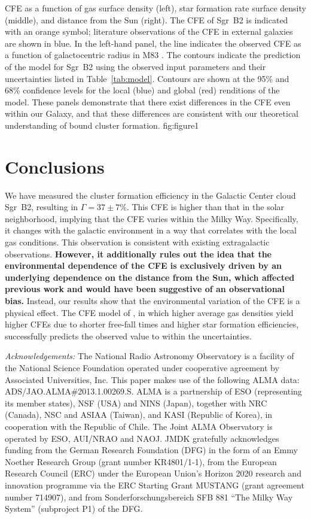 \documentclass[twocolumn]{aastex62}
\def\referee#1{\textbf{#1}}
\begin{document}
{CFE as a function of gas surface density (left), star formation rate surface
density (middle), and distance from the Sun (right). The CFE of Sgr~B2 is
indicated with an orange symbol; literature observations of the CFE in
external galaxies are shown in blue. In the left-hand panel, the line indicates
the observed CFE as a function of galactocentric radius in M83
\citep{Adamo2015a}. The contours indicate the prediction of the
\citet{Kruijssen2012a} model for Sgr~B2 using the observed input parameters and
their uncertainties listed in Table~\ref{tab:model}. Contours are shown at the
95\% and 68\% confidence levels for the local (blue) and global (red)
renditions of the model. These panels demonstrate that there exist differences
in the CFE even within our Galaxy, and that these differences are consistent
with our theoretical understanding of bound cluster formation. 
}
{fig:figure}{1}{\textwidth}

\section{Conclusions}
We have measured the cluster formation efficiency in the Galactic Center cloud
Sgr~B2, resulting in $\Gamma=37\pm7\%$. This CFE is higher than that in the solar
neighborhood, implying that the CFE varies within the Milky Way. Specifically,
it changes with the galactic environment in a way that correlates with the
local gas conditions. This observation is consistent with existing extragalactic
observations.  \referee{However, it additionally rules out the idea that the
environmental dependence of the CFE is exclusively driven by an underlying
dependence on the distance from the Sun, which affected previous work and would have
been suggestive of an observational bias.} Instead, our results show that the
environmental variation of the CFE is a physical effect. The CFE model of
\citet{Kruijssen2012a}, in which higher average gas densities yield higher CFEs
due to shorter free-fall times and higher star formation efficiencies,
successfully predicts the observed value to within the uncertainties.



\textit{Acknowledgements:}
The National Radio Astronomy Observatory is a facility of the National Science
Foundation operated under cooperative agreement by Associated Universities,
Inc.
This paper makes use of the following ALMA data: ADS/JAO.ALMA\#2013.1.00269.S.
ALMA is a partnership of ESO (representing its member states), NSF (USA) and
NINS (Japan), together with NRC (Canada), NSC and ASIAA (Taiwan), and KASI
(Republic of Korea), in cooperation with the Republic of Chile. The Joint ALMA
Observatory is operated by ESO, AUI/NRAO and NAOJ.
JMDK gratefully acknowledges funding from the German
Research Foundation (DFG) in the form of an Emmy Noether Research Group (grant
number KR4801/1-1), from the European Research Council (ERC) under the European
Union's Horizon 2020 research and innovation programme via the ERC Starting
Grant MUSTANG (grant agreement number 714907), and from Sonderforschungsbereich
SFB 881 ``The Milky Way System'' (subproject P1) of the DFG.
\end{document}
